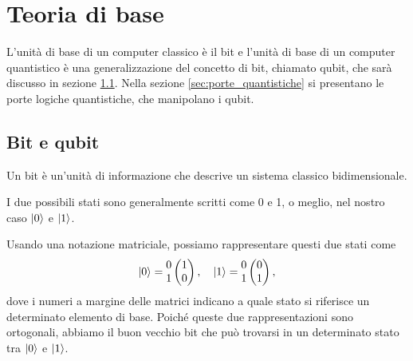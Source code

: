 \chapter{Teoria di base}\label{ch:teoria}


L'unità di base di un computer classico è il bit e l'unità di base di 
un computer quantistico è una generalizzazione del concetto di bit, 
chiamato qubit, che sarà discusso in sezione \ref{sec:qubit}. 
Nella sezione \ref{sec:porte_quantistiche} si presentano le porte 
logiche quantistiche, che manipolano i qubit. 

\section{Bit e qubit} \label{sec:qubit}

Un bit è un'unità di informazione che descrive un sistema classico 
bidimensionale. 

I due possibili stati sono generalmente scritti come 
0 e 1, o meglio, nel nostro caso $\ket{0}$ e $\ket{1}$. 

Usando una notazione matriciale, possiamo rappresentare questi due 
stati come 
\begin{equation}
    \ket{0} = \begin{matrix}
        0 \\ 1
    \end{matrix}
    \begin{pmatrix}
        1 \\ 0
    \end{pmatrix}, \quad
    \ket{1} = \begin{matrix}
        0 \\ 1
    \end{matrix}
    \begin{pmatrix}
        0 \\ 1
    \end{pmatrix},
\end{equation}
dove i numeri a margine delle matrici indicano a quale stato si 
riferisce un determinato elemento di base. Poiché queste due 
rappresentazioni sono ortogonali, abbiamo il buon vecchio bit che 
può trovarsi in un determinato stato tra $\ket{0}$ e $\ket{1}$. 

